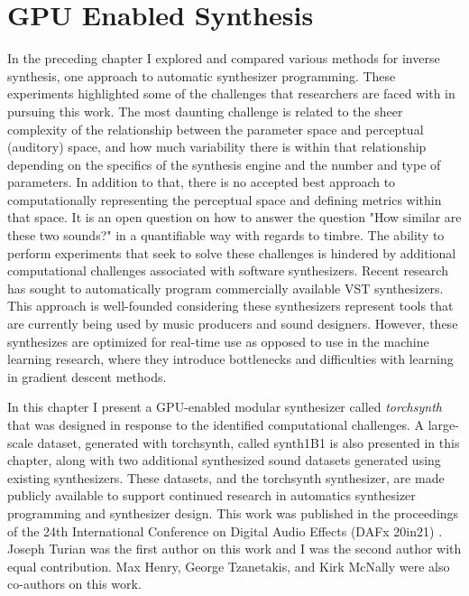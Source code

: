 \graphicspath{{./}{./figures/}{./figures/torchsynth/}}

\chapter{GPU Enabled Synthesis}
\label{ch:torchsynth}

In the preceding chapter I explored and compared various methods for inverse synthesis, one approach to automatic synthesizer programming. These experiments highlighted some of the challenges that researchers are faced with in pursuing this work. The most daunting challenge is related to the sheer complexity of the relationship between the parameter space and perceptual (auditory) space, and how much variability there is within that relationship depending on the specifics of the synthesis engine and the number and type of parameters. In addition to that, there is no accepted best approach to computationally representing the perceptual space and defining metrics within that space. It is an open question on how to answer the question "How similar are these two sounds?" in a quantifiable way with regards to timbre. The ability to perform experiments that seek to solve these challenges is hindered by additional computational challenges associated with software synthesizers. Recent research has sought to automatically program commercially available VST synthesizers. This approach is well-founded considering these synthesizers represent tools that are currently being used by music producers and sound designers. However, these synthesizes are optimized for real-time use as opposed to use in the machine learning research, where they introduce bottlenecks \cite{masudo2021quality} and difficulties with learning in gradient descent methods.

In this chapter I present a GPU-enabled modular synthesizer called \textit{torchsynth} that was designed in response to the identified computational challenges. A large-scale dataset, generated with torchsynth, called synth1B1 is also presented in this chapter, along with two additional synthesized sound datasets generated using existing synthesizers. These datasets, and the torchsynth synthesizer, are made publicly available to support continued research in automatics synthesizer programming and synthesizer design. This work was published in the proceedings of the 24th International Conference on Digital Audio Effects (DAFx 20in21) \cite{turian2021one}. Joseph Turian was the first author on this work and I was the second author with equal contribution. Max Henry, George Tzanetakis, and Kirk McNally were also co-authors on this work.

